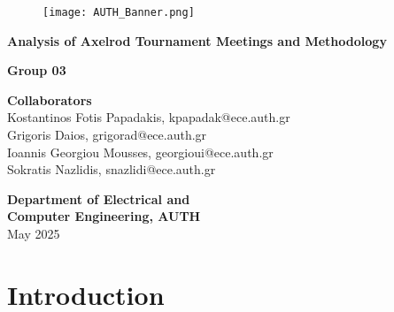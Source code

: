 \documentclass[12pt]{report}
\begin{document}
\begin{titlepage}
\begin{center}
    \vspace{1cm}

    \begin{figure}[h]
        \centering
        \texttt{[image: AUTH\_Banner.png]}
    \end{figure}
    
    \vspace{2cm}
    \Huge\textbf{Analysis of Axelrod Tournament Meetings and Methodology}\\
    \vspace{2.5cm}

    \Large\textbf{Group 03}
    \vspace{2.5cm}

        
    \Large\textbf{Collaborators}\\  
    \vspace{0.2cm}
    \large
    Kostantinos Fotis Papadakis, kpapadak@ece.auth.gr\\ 
    \vspace{0.2cm}
    Grigoris Daios, grigorad@ece.auth.gr \\  
    \vspace{0.2cm}
    Ioannis Georgiou Mousses, georgioui@ece.auth.gr  \\  
    \vspace{0.2cm}
    Sokratis Nazlidis, snazlidi@ece.auth.gr \\  
    \vspace{2cm}
    
    
\begin{center}
        \large{\textbf{Department of Electrical and \\ Computer Engineering, AUTH}}\\ May 2025
        
    \end{center}
\end{center}
\end{titlepage}

\tableofcontents
\newpage
\chapter{Introduction}
\end{document}
